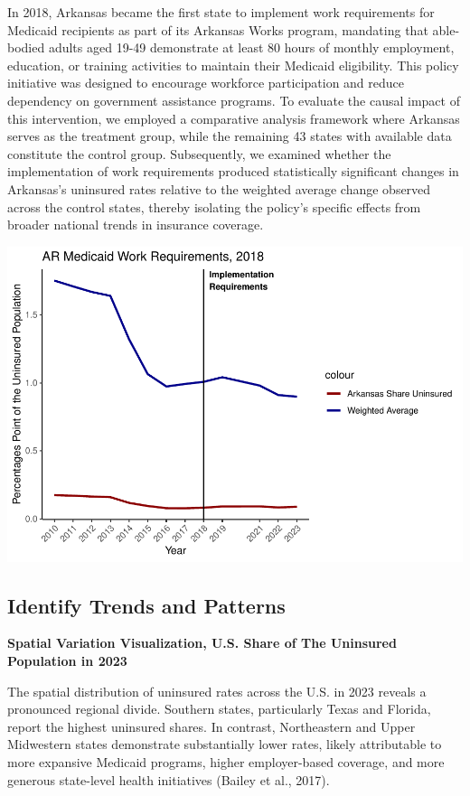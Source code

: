 \documentclass[
]{article}
\begin{document}
In 2018, Arkansas became the first state to implement work requirements
for Medicaid recipients as part of its Arkansas Works program, mandating
that able-bodied adults aged 19-49 demonstrate at least 80 hours of
monthly employment, education, or training activities to maintain their
Medicaid eligibility. This policy initiative was designed to encourage
workforce participation and reduce dependency on government assistance
programs. To evaluate the causal impact of this intervention, we
employed a comparative analysis framework where Arkansas serves as the
treatment group, while the remaining 43 states with available data
constitute the control group. Subsequently, we examined whether the
implementation of work requirements produced statistically significant
changes in Arkansas's uninsured rates relative to the weighted average
change observed across the control states, thereby isolating the
policy's specific effects from broader national trends in insurance
coverage.

\includegraphics[width=0.8\linewidth]{template_files/figure-latex/visualization event-1}

\subsection{Identify Trends and
Patterns}\label{identify-trends-and-patterns}

\textbf{Spatial Variation Visualization, U.S. Share of The Uninsured
Population in 2023}

The spatial distribution of uninsured rates across the U.S. in 2023
reveals a pronounced regional divide. Southern states, particularly
Texas and Florida, report the highest uninsured shares. In contrast,
Northeastern and Upper Midwestern states demonstrate substantially lower
rates, likely attributable to more expansive Medicaid programs, higher
employer-based coverage, and more generous state-level health
initiatives (Bailey et al., 2017).
\end{document}
